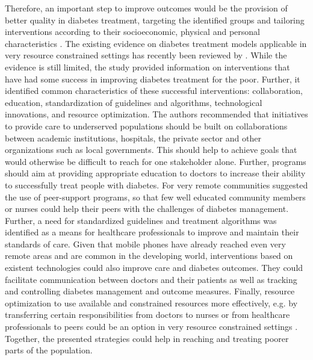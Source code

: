 Therefore, an important step to improve outcomes would be the provision of better quality in diabetes treatment, targeting the identified groups and tailoring interventions according to their socioeconomic, physical and personal characteristics \parencite{Cefalu2016}. The existing evidence on diabetes treatment models applicable in very resource constrained settings has recently been reviewed by \textcite{Esterson2014}. While the evidence is still limited, the study provided information on interventions that have had some success in improving diabetes treatment for the poor. Further, it identified common characteristics of these successful interventions: collaboration, education, standardization of guidelines and algorithms, technological innovations, and resource optimization. The authors recommended that initiatives to provide care to underserved populations should be built on collaborations between academic institutions, hospitals, the private sector and other organizations such as local governments. This should help to achieve goals that would otherwise be difficult to reach for one stakeholder alone. Further, programs should aim at providing appropriate education to doctors to increase their ability to successfully treat people with diabetes. For very remote communities \textcite{Esterson2014} suggested the use of peer-support programs, so that few well educated community members or nurses could help their peers with the challenges of diabetes management. Further, a need for standardized guidelines and treatment algorithms was identified as a means for healthcare professionals to improve and maintain their standards of care. Given that mobile phones have already reached even very remote areas and are common in the developing world, interventions based on existent technologies could also improve care and diabetes outcomes. They could facilitate communication between doctors and their patients as well as tracking and controlling diabetes management and outcome measures. Finally, resource optimization to use available and constrained resources more effectively, e.g. \DIFdelbegin \DIFdel{, }\DIFdelend by transferring certain responsibilities from doctors to nurses or from healthcare professionals to peers could be an option in very resource constrained settings \parencite{Esterson2014}. Together, the presented strategies could help in reaching and treating poorer parts of the population.

